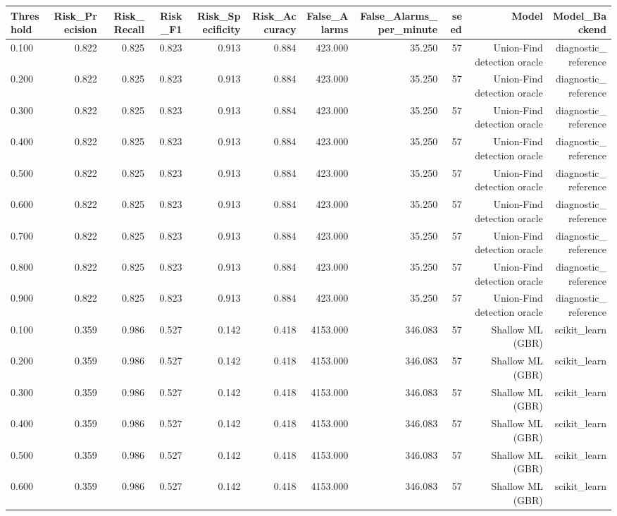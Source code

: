 \begin{tabular}{lrrrrrrrrrr}
\toprule
Threshold & Risk\_Precision & Risk\_Recall & Risk\_F1 & Risk\_Specificity & Risk\_Accuracy & False\_Alarms & False\_Alarms\_per\_minute & seed & Model & Model\_Backend \\
\midrule
0.100 & 0.822 & 0.825 & 0.823 & 0.913 & 0.884 & 423.000 & 35.250 & 57 & Union-Find detection oracle & diagnostic\_reference \\
0.200 & 0.822 & 0.825 & 0.823 & 0.913 & 0.884 & 423.000 & 35.250 & 57 & Union-Find detection oracle & diagnostic\_reference \\
0.300 & 0.822 & 0.825 & 0.823 & 0.913 & 0.884 & 423.000 & 35.250 & 57 & Union-Find detection oracle & diagnostic\_reference \\
0.400 & 0.822 & 0.825 & 0.823 & 0.913 & 0.884 & 423.000 & 35.250 & 57 & Union-Find detection oracle & diagnostic\_reference \\
0.500 & 0.822 & 0.825 & 0.823 & 0.913 & 0.884 & 423.000 & 35.250 & 57 & Union-Find detection oracle & diagnostic\_reference \\
0.600 & 0.822 & 0.825 & 0.823 & 0.913 & 0.884 & 423.000 & 35.250 & 57 & Union-Find detection oracle & diagnostic\_reference \\
0.700 & 0.822 & 0.825 & 0.823 & 0.913 & 0.884 & 423.000 & 35.250 & 57 & Union-Find detection oracle & diagnostic\_reference \\
0.800 & 0.822 & 0.825 & 0.823 & 0.913 & 0.884 & 423.000 & 35.250 & 57 & Union-Find detection oracle & diagnostic\_reference \\
0.900 & 0.822 & 0.825 & 0.823 & 0.913 & 0.884 & 423.000 & 35.250 & 57 & Union-Find detection oracle & diagnostic\_reference \\
0.100 & 0.359 & 0.986 & 0.527 & 0.142 & 0.418 & 4153.000 & 346.083 & 57 & Shallow ML (GBR) & scikit\_learn \\
0.200 & 0.359 & 0.986 & 0.527 & 0.142 & 0.418 & 4153.000 & 346.083 & 57 & Shallow ML (GBR) & scikit\_learn \\
0.300 & 0.359 & 0.986 & 0.527 & 0.142 & 0.418 & 4153.000 & 346.083 & 57 & Shallow ML (GBR) & scikit\_learn \\
0.400 & 0.359 & 0.986 & 0.527 & 0.142 & 0.418 & 4153.000 & 346.083 & 57 & Shallow ML (GBR) & scikit\_learn \\
0.500 & 0.359 & 0.986 & 0.527 & 0.142 & 0.418 & 4153.000 & 346.083 & 57 & Shallow ML (GBR) & scikit\_learn \\
0.600 & 0.359 & 0.986 & 0.527 & 0.142 & 0.418 & 4153.000 & 346.083 & 57 & Shallow ML (GBR) & scikit\_learn \\

\end{tabular}
